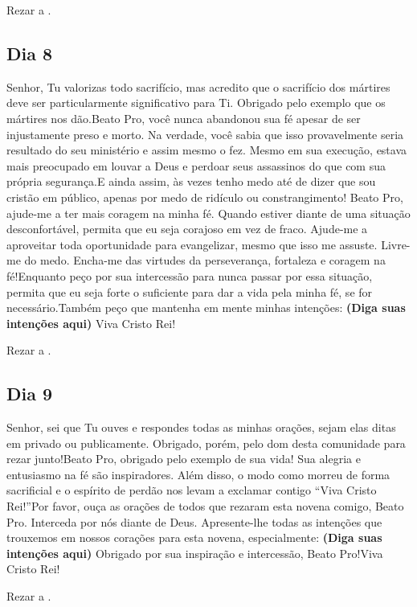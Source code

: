 \documentclass[a4paper,14pt,twoside]{extarticle} \usepackage[utf8]{inputenc}
\begin{document}
Rezar a \textbf{}.

\subsection{Dia 8}

Senhor, Tu valorizas todo sacrifício, mas acredito que o sacrifício dos
mártires deve ser particularmente significativo para Ti. Obrigado pelo exemplo
que os mártires nos dão.Beato Pro, você nunca abandonou sua fé apesar de ser
injustamente preso e morto. Na verdade, você sabia que isso provavelmente seria
resultado do seu ministério e assim mesmo o fez. Mesmo em sua execução, estava
mais preocupado em louvar a Deus e perdoar seus assassinos do que com sua
própria segurança.E ainda assim, às vezes tenho medo até de dizer que sou
cristão em público, apenas por medo de ridículo ou constrangimento! Beato Pro,
ajude-me a ter mais coragem na minha fé. Quando estiver diante de uma situação
desconfortável, permita que eu seja corajoso em vez de fraco. Ajude-me a
aproveitar toda oportunidade para evangelizar, mesmo que isso me assuste.
Livre-me do medo. Encha-me das virtudes da perseverança, fortaleza e coragem na
fé!Enquanto peço por sua intercessão para nunca passar por essa situação,
permita que eu seja forte o suficiente para dar a vida pela minha fé, se for
necessário.Também peço que mantenha em mente minhas intenções: \textbf{(Diga
suas intenções aqui)} Viva Cristo Rei!

Rezar a \textbf{}.

\subsection{Dia 9}

Senhor, sei que Tu ouves e respondes todas as minhas orações, sejam elas ditas em privado ou publicamente. Obrigado, porém, pelo dom desta comunidade para rezar junto!Beato Pro, obrigado pelo exemplo de sua vida! Sua alegria e entusiasmo na fé são inspiradores. Além disso, o modo como morreu de forma sacrificial e o espírito de perdão nos levam a exclamar contigo “Viva Cristo Rei!”Por favor, ouça as orações de todos que rezaram esta novena comigo, Beato Pro. Interceda por nós diante de Deus. Apresente-lhe todas as intenções que trouxemos em nossos corações para esta novena, especialmente: \textbf{(Diga suas intenções aqui)} Obrigado por sua inspiração e intercessão, Beato Pro!Viva Cristo Rei!

Rezar a \textbf{}.
\end{document}
